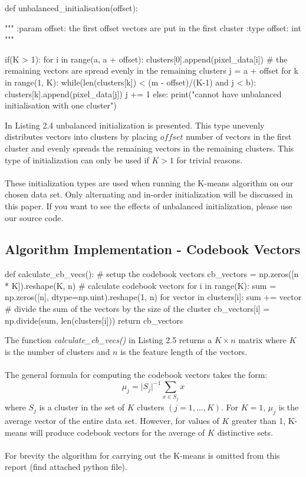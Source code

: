 \documentclass[a4paper, 11pt]{report}
\begin{document}
\begin{python}[caption=Unbalanced initialization]
def unbalanced_initialisation(offset):

    """
    :param offset: the first offset vectors are put in the first cluster  
    :type offset: int
    """

    if(K > 1):
        for i in range(a, a + offset):
            clusters[0].append(pixel_data[i])
        # the remaining vectors are spread evenly in the remaining clusters
        j = a + offset
        for k in range(1, K):
            while(len(clusters[k]) < (m - offset)/(K-1) and j < b):
                clusters[k].append(pixel_data[j])
                j += 1
    else:
        print("cannot have unbalanced initialisation with one cluster")
\end{python}
In Listing 2.4 unbalanced initialization is presented. This type unevenly distributes vectors into clusters by placing $offset$ number of vectors in the first cluster and evenly spreads the remaining vectors in the remaining clusters. This type of initialization can only be used if $K>1$ for trivial reasons.\\ \\
These initialization types are used when running the K-means algorithm on our chosen data set. Only alternating and in-order initialization will be discussed in this paper. If you want to see the effects of unbalanced initialization, please use our source code.
\subsection{Algorithm Implementation - Codebook Vectors}
\begin{python}[caption=Calculate Codebook Vectors]
def calculate_cb_vecs():
    # setup the codebook vectors
    cb_vectors = np.zeros([n * K]).reshape(K, n)
    # calculate codebook vectors
    for i in range(K):
        sum = np.zeros([n], dtype=np.uint).reshape(1, n)
        for vector in clusters[i]:
            sum += vector
        # divide the sum of the vectors by the size of the cluster
        cb_vectors[i] = np.divide(sum, len(clusters[i]))
return cb_vectors
\end{python}
The function \textit{calculate\_cb\_vecs()} in Listing 2.5 returns a $K \times n$ matrix where $K$ is the number of clusters and $n$ is the feature length of the vectors.\\\\
The general formula for computing the codebook vectors takes the form:
$$\mu_j = {\vert S_j \vert}^{-1} \sum_{x \in S_j}x$$
where $S_j$ is a cluster in the set of $K$ clusters $(j = 1, ..., K)$. For $K=1$, $\mu_j$ is the average vector of the entire data set. However, for values of $K$ greater than 1, K-means will produce codebook vectors for the average of $K$ distinctive sets.\\\\
For brevity the algorithm for carrying out the K-means is omitted from this report (find attached python file).
\end{document}
